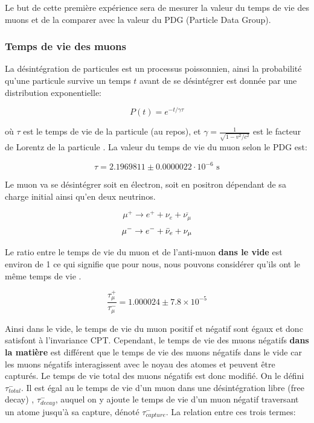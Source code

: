 \documentclass[12pt]{article}
\begin{document}
Le but de cette première expérience sera de mesurer la valeur du temps de vie des muons et de la comparer avec la valeur du PDG (Particle Data Group)\cite{PhysRevD.98.030001}.

\subsubsection{Temps de vie des muons}
La désintégration de particules est un processus poissonnien, ainsi la probabilité qu'une particule survive un temps $t$ avant de se désintégrer est donnée par une distribution exponentielle:

\begin{equation}
P(t) = e^{-t/\gamma\tau}
\end{equation}
\vspace{2mm}

où $\tau$  est le temps de vie de la particule (au repos), et $\gamma = \frac{1}{\sqrt{1-v^2/c^2}}$ est le facteur de Lorentz de la particule \cite{noauthor_particle_2019}. La valeur du temps de vie du muon selon le PDG est: 

\[\tau = 2.1969811\pm0.0000022\cdot10^{-6} \text{ s}\]

Le muon va se désintégrer soit en électron, soit en positron dépendant de sa charge initial ainsi qu'en deux neutrinos.

\[\mu^{+}\to e^{+}+\nu_{e}+\overline{\nu_{\mu}} \]
\[ \mu^{-} \rightarrow e^{-} + \Bar{\nu}_{e} + \nu_{\mu} \]


Le ratio entre le temps de vie du muon et de l'anti-muon \textbf{dans le vide} est environ de 1 ce qui signifie que pour nous, nous pouvons considérer qu'ils ont le même temps de vie \cite{haxton_symmetries_1995}.

\[\frac{\tau^{+}_{\mu}}{\tau^{-}_{\mu}}=1.000024\pm7.8\times10^{-5}\]

Ainsi dans le vide, le temps de vie du muon positif et négatif sont égaux et donc satisfont à l'invariance CPT. Cependant, le temps de vie des muons négatifs \textbf{dans la matière} est différent que le temps de vie des muons négatifs dans le vide car les muons négatifs interagissent avec le noyau des atomes et peuvent être capturés. Le temps de vie total des muons négatifs est donc modifié. On le défini $\tau_{total}^{-}$. Il est égal au le temps de vie d'un muon dans une désintégration libre (free decay) , $\tau_{decay}^{-}$, auquel on y ajoute le temps de vie d'un  muon négatif traversant un atome jusqu'à sa capture, dénoté  $\tau_{capture}^{-}$. La relation entre ces trois termes: 
\end{document}
